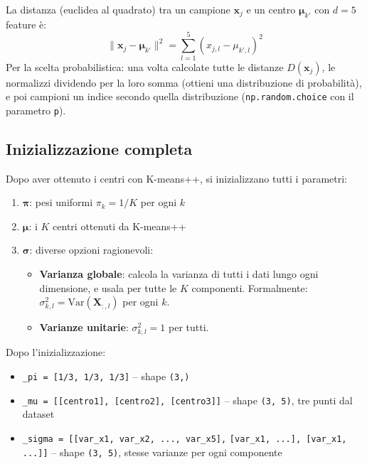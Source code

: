 \documentclass[11pt,a4paper]{article}
\begin{document}
\begin{tipbox}
La distanza (euclidea al quadrato) tra un campione $\mathbf{x}_j$ e un centro $\boldsymbol{\mu}_{k'}$ con $d=5$ feature \`e:
$$\|\mathbf{x}_j - \boldsymbol{\mu}_{k'}\|^2 = \sum_{l=1}^{5} (x_{j,l} - \mu_{k',l})^2$$
Per la scelta probabilistica: una volta calcolate tutte le distanze $D(\mathbf{x}_j)$, le normalizzi dividendo per la loro somma (ottieni una distribuzione di probabilit\`a), e poi campioni un indice secondo quella distribuzione (\texttt{np.random.choice} con il parametro \texttt{p}).
\end{tipbox}

\subsection{Inizializzazione completa}

Dopo aver ottenuto i centri con K-means++, si inizializzano tutti i parametri:

\begin{enumerate}
    \item $\boldsymbol{\pi}$: pesi uniformi $\pi_k = 1/K$ per ogni $k$

    \item $\boldsymbol{\mu}$: i $K$ centri ottenuti da K-means++

    \item $\boldsymbol{\sigma}$: diverse opzioni ragionevoli:
    \begin{itemize}
        \item \textbf{Varianza globale}: calcola la varianza di tutti i dati lungo ogni dimensione, e usala per tutte le $K$ componenti. Formalmente: $\sigma_{k,l}^2 = \text{Var}(\mathbf{X}_{:,l})$ per ogni $k$.
        \item \textbf{Varianze unitarie}: $\sigma_{k,l}^2 = 1$ per tutti.
    \end{itemize}
\end{enumerate}

\begin{exbox}[Esempio concreto per $K=3$, $d=5$]
Dopo l'inizializzazione:
\begin{itemize}
    \item \texttt{\_pi = [1/3, 1/3, 1/3]} -- shape \texttt{(3,)}
    \item \texttt{\_mu = [[centro1], [centro2], [centro3]]} -- shape \texttt{(3, 5)}, tre punti dal dataset
    \item \texttt{\_sigma = [[var\_x1, var\_x2, ..., var\_x5],} \texttt{[var\_x1, ...], [var\_x1, ...]]} -- shape \texttt{(3, 5)}, stesse varianze per ogni componente
\end{itemize}
\end{exbox}
\end{document}
